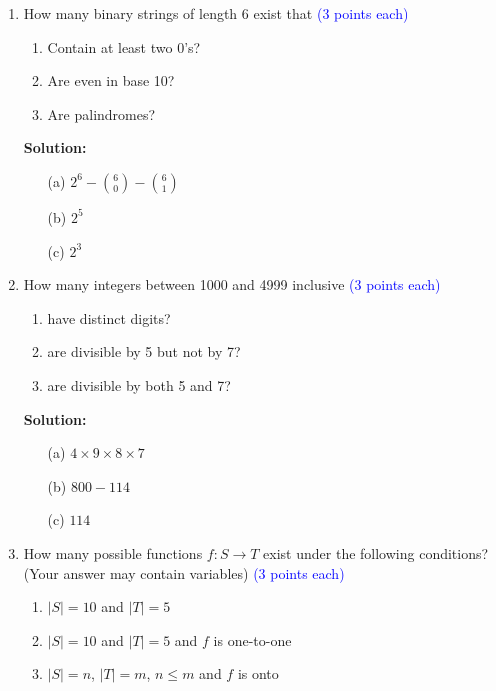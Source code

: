 \documentclass{article}
\newcommand{\pte}[1]{\textcolor{blue}{(#1 points each)}}
\newenvironment{solution}
{
\par
\color{blue}
\textbf{Solution:}
}
{
\par
}
\begin{document}
\begin{enumerate}

\item How many binary strings of length 6 exist that \pte{3}
\begin{enumerate}
    \item Contain at least two 0's?
    \item Are even in base 10?
    \item Are palindromes?
\end{enumerate}

\begin{solution}
\begin{enumerate}
    \item[(a)] $2^6 - {6 \choose 0} - {6 \choose 1}$
    \item[(b)] $2^5$
    \item[(c)] $2^3$
\end{enumerate}
\end{solution}

\item How many integers between 1000 and 4999 inclusive \pte{3}
\begin{enumerate}
    \item have distinct digits?
    \item are divisible by 5 but not by 7?
    \item are divisible by both 5 and 7?
\end{enumerate}

\begin{solution}
\begin{enumerate}
    \item[(a)] $4 \times 9 \times 8 \times 7$
    \item[(b)] $800-114$
    \item[(c)] $114$
\end{enumerate}
\end{solution}


\item How many possible functions $f:S \rightarrow T$ exist under the following conditions? (Your answer may contain variables) \pte{3}
\begin{enumerate}
    \item $|S|=10$ and $|T|=5$
    \item $|S|=10$ and $|T|=5$ and $f$ is one-to-one
    \item $|S|=n$, $|T|=m$, $n \leq m$ and $f$ is onto 
\end{enumerate}


\end{enumerate}
\end{document}
